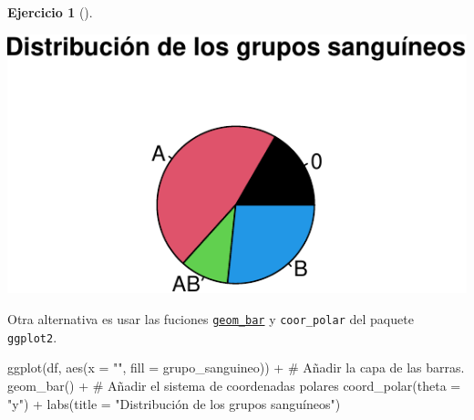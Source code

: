 \documentclass[
  a4paper,
]{scrreport}
\newenvironment{Shaded}{\begin{snugshade}}{\end{snugshade}}
\newcommand{\AttributeTok}[1]{\textcolor[rgb]{0.40,0.45,0.13}{#1}}
\newcommand{\CommentTok}[1]{\textcolor[rgb]{0.37,0.37,0.37}{#1}}
\newcommand{\FunctionTok}[1]{\textcolor[rgb]{0.28,0.35,0.67}{#1}}
\newcommand{\NormalTok}[1]{\textcolor[rgb]{0.00,0.23,0.31}{#1}}
\newcommand{\SpecialCharTok}[1]{\textcolor[rgb]{0.37,0.37,0.37}{#1}}
\newcommand{\StringTok}[1]{\textcolor[rgb]{0.13,0.47,0.30}{#1}}
\theoremstyle{definition}
\newtheorem{exercise}{Ejercicio}[chapter]
\theoremstyle{remark}
\begin{document}
\begin{exercise}[]
\begin{enumerate}
\begin{tcolorbox}
  \includegraphics{03-frecuencias-graficos_files/figure-pdf/unnamed-chunk-26-1.pdf}

  \end{tcolorbox}

  \begin{tcolorbox}[enhanced jigsaw, toprule=.15mm, rightrule=.15mm, arc=.35mm, colback=white, colbacktitle=quarto-callout-tip-color!10!white, toptitle=1mm, left=2mm, colframe=quarto-callout-tip-color-frame, opacityback=0, breakable, opacitybacktitle=0.6, bottomtitle=1mm, titlerule=0mm, title=\textcolor{quarto-callout-tip-color}{\faLightbulb}\hspace{0.5em}{Solución 2}, bottomrule=.15mm, coltitle=black, leftrule=.75mm]

  Otra alternativa es usar las fuciones
  \href{https://aprendeconalf.es/manual-r/07-graficos.html\#diagrama-de-sectores}{\texttt{geom\_bar}}
  y \texttt{coor\_polar} del paquete \texttt{ggplot2}.

\begin{Shaded}
\begin{Highlighting}[]
\FunctionTok{ggplot}\NormalTok{(df, }\FunctionTok{aes}\NormalTok{(}\AttributeTok{x =} \StringTok{""}\NormalTok{, }\AttributeTok{fill =}\NormalTok{ grupo\_sanguineo)) }\SpecialCharTok{+}
    \CommentTok{\# Añadir la capa de las barras.}
    \FunctionTok{geom\_bar}\NormalTok{() }\SpecialCharTok{+}
    \CommentTok{\# Añadir el sistema de coordenadas polares}
    \FunctionTok{coord\_polar}\NormalTok{(}\AttributeTok{theta =} \StringTok{"y"}\NormalTok{) }\SpecialCharTok{+}
    \FunctionTok{labs}\NormalTok{(}\AttributeTok{title =} \StringTok{"Distribución de los grupos sanguíneos"}\NormalTok{)}
\end{Highlighting}
\end{Shaded}


\end{tcolorbox}
\end{enumerate}
\end{exercise}
\end{document}
